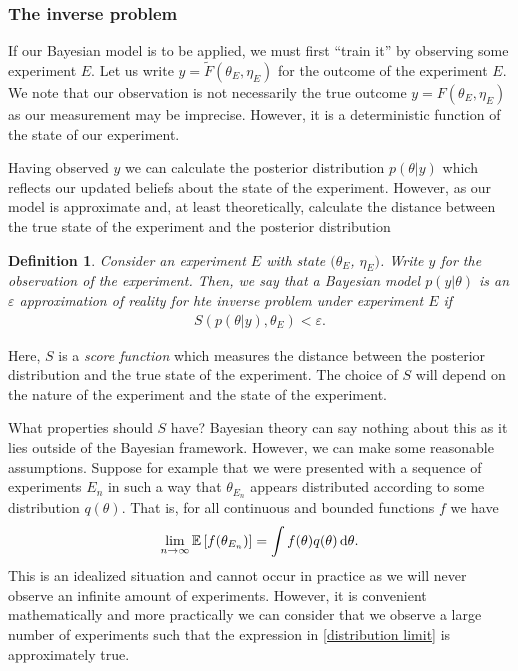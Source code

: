 \documentclass[
    a4paper,
    DIV=14,
    abstract=true,
    numbers=noenddot
]
{scrartcl}
\newtheorem{definition}[theorem]{Definition}
\theoremstyle{definition}
\newcommand{\tl}[1]{\widetilde{#1}}
\renewcommand{\d}{\,\mathrm{d}}\newcommand{\dx}{\,\mathrm{d}x}
\newcommand{\E}{\mathbb{E}}
\begin{document}
\subsubsection{The inverse problem}
If our Bayesian model is to be applied, we must first ``train it'' by observing some experiment $E$. Let us write $y= \tl{F}(\theta_E, \eta _E)$ for the outcome of the experiment $E$. We note that our observation is not necessarily the true outcome $y=F(\theta _E, \eta _E)$ as our measurement may be imprecise. However, it is a deterministic function of the state of our experiment.

Having observed $y$ we can calculate the posterior distribution $p(\theta |y)$ which reflects our updated beliefs about the state of the experiment. However, as our model is approximate and, at least theoretically, calculate the distance between the true state of the experiment and the posterior distribution
\begin{definition}
    Consider an experiment $E$ with state $(\theta _E$, $\eta _E)$. Write $y$ for the observation of the experiment. Then, we say that a Bayesian model $p(y|\theta )$ is an \emph{$\varepsilon $ approximation of reality for hte inverse problem under experiment $E$} if
    \begin{align*}
        S(p(\theta  |y), \theta _E)< \varepsilon.
    \end{align*}
\end{definition}
Here, $S$ is a \emph{score function} which measures the distance between the posterior distribution and the true state of the experiment. The choice of $S$ will depend on the nature of the experiment and the state of the experiment.

What properties should $S$ have? Bayesian theory can say nothing about this as it lies outside of the Bayesian framework. However, we can make some reasonable assumptions.
Suppose for example that we were presented with a sequence of experiments $E_n$ in such a way that $\theta _{E_n}$ appears distributed according to some distribution $q(\theta )$. That is, for all continuous and bounded functions $f$ we have
\begin{align}\label{distribution limit}
    \lim_{n\to\infty}\E\qb{ f(\theta _{E_n})}= \int f(\theta )q(\theta )\d \theta.
\end{align}
This is an idealized situation and cannot occur in practice as we will never observe an infinite amount of experiments. However, it is convenient mathematically and more practically we can consider that we observe a large number of experiments such that the expression in \eqref{distribution limit} is approximately true.
\end{document}
